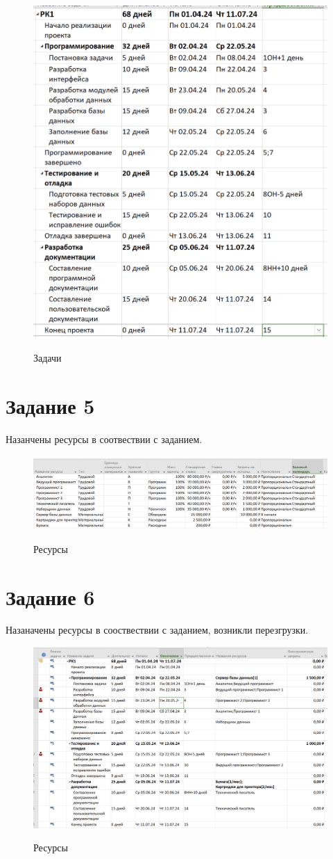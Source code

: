 \begin{figure}[ht!]
	\includegraphics[width=0.75\linewidth]{assets/images/4-task.png}
	\label{fig:r2}
	\caption{Задачи}
\end{figure}
\FloatBarrier


\section{Задание 5}

Назанчены ресурсы в соотвествии с заданием.

\begin{figure}[ht!]
	\includegraphics[width=0.75\linewidth]{assets/images/5-task.png}
	\label{fig:r2}
	\caption{Ресурсы}
\end{figure}
\FloatBarrier

\section{Задание 6}

Назаначены ресурсы в сооствествии с заданием, возникли перезгрузки.

\begin{figure}[ht!]
	\includegraphics[width=0.75\linewidth]{assets/images/6-tasks.png}
	\label{fig:r2}
	\caption{Ресурсы}
\end{figure}
\FloatBarrier